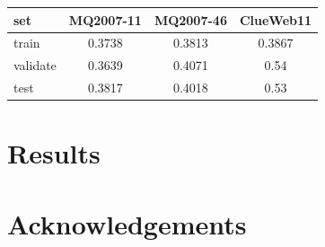 \begin{center}
  \begin{tabular}{ l | c | c | c}
    set & MQ2007-11 & MQ2007-46 & ClueWeb11  \\
    \hline
    train & 0.3738 & 0.3813 &  0.3867 \\
    validate & 0.3639 & 0.4071 &  0.54\\
    test & 0.3817 & 0.4018 & 0.53\\
    \hline
  \end{tabular}
   \label{tab:countsscoure} 
\end{center}


\section{Results}
\section{Acknowledgements}